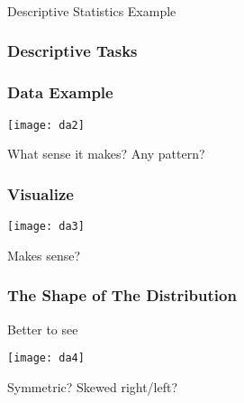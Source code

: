 \begin{frame}[fragile]\frametitle{}
\begin{center}
{\Large Descriptive Statistics Example}
\end{center}
\end{frame}


\begin{frame}[fragile] \frametitle{Descriptive Tasks}

\hfill
{}

\end{frame}



\begin{frame}[fragile]\frametitle{Data Example}	
\begin{center}
\texttt{[image: da2]}
\end{center}
What sense it makes?
Any pattern?


\end{frame}

\begin{frame}[fragile]\frametitle{Visualize}	
\begin{center}
\texttt{[image: da3]}
\end{center}
Makes sense?


\end{frame}

\begin{frame}[fragile]\frametitle{The Shape of The Distribution}	
Better to see
\begin{center}
\texttt{[image: da4]}
\end{center}
Symmetric? Skewed right/left?
\end{frame}

